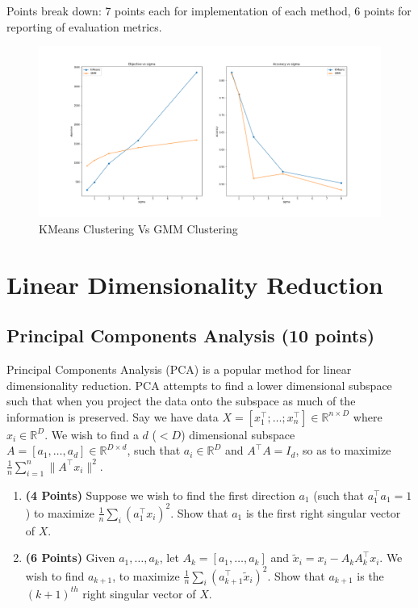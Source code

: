 \documentclass[a4paper]{article}
\theoremstyle{definition}
\newcommand{\RR}{\mathbb{R}}
\newenvironment{soln}{
  \leavevmode\color{blue}\ignorespaces
}{}
\begin{document}
Points break down: 7 points each for implementation of each method, 6 points for reporting of
evaluation metrics.

\begin{soln}
  \begin{figure}[H]
    \centering
    \includegraphics[width=1\textwidth]{clustering.png}
    \caption{KMeans Clustering Vs GMM Clustering}
    \label{fig:kmeans}
  \end{figure}
\end{soln}

\section{Linear Dimensionality Reduction}

\subsection{Principal Components Analysis  (10 points)}
\label{sec:pca}

Principal Components Analysis (PCA) is a popular method for linear dimensionality reduction. PCA attempts to find a lower dimensional subspace such that when you project the data onto the subspace as much of the information is preserved. Say we have data $X = [x_1^\top; \dots; x_n^\top] \in \RR^{n\times D}$ where  $x_i \in \RR^D$. We wish to find a $d$ ($ < D$) dimensional subspace $A = [a_1, \dots, a_d] \in \RR^{D\times d}$, such that $ a_i \in \RR^D$ and $A^\top A = I_d$, so as to maximize $\frac{1}{n} \sum_{i=1}^n \|A^\top x_i\|^2$.
\begin{enumerate}

\item  \textbf{(4 Points)}
Suppose we wish to find the first direction $a_1$ (such that $a_1^\top a_1 = 1$) to maximize $\frac{1}{n} \sum_i (a_1^\top x_i)^2$.
Show that $a_1$ is the first right singular vector of $X$.

\item  \textbf{(6 Points)}
Given $a_1, \dots, a_k$, let $A_k = [a_1, \dots, a_k]$ and 
$\tilde{x}_i = x_i - A_kA_k^\top x_i$. We wish to find $a_{k+1}$, to maximize
$\frac{1}{n} \sum_i (a_{k+1}^\top \tilde{x}_i)^2$. Show that $a_{k+1}$ is the
$(k+1)^{th}$ right singular vector of $X$.


\end{enumerate}
\end{document}

